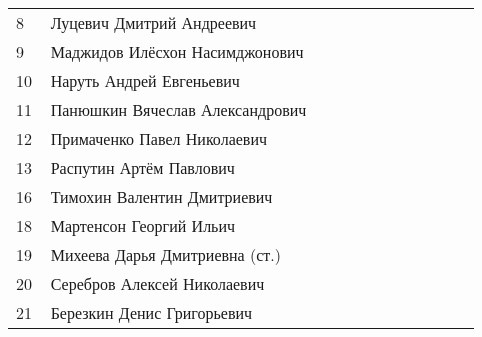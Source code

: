 \documentclass[a4paper,landscape,11pt]{article}
\newcommand*\ok{&{\small \ding{51}}} %
\newcommand*\no{&{\small }} %
\begin{document}
\begin{tabular}{p{7pt}|l|p{6pt}p{6pt}p{6pt}p{6pt}p{6pt}p{6pt}p{6pt}p{6pt}p{6pt}p{6pt}}
 8\,&Луцевич Дмитрий Андреевич          \ok\ok\ok\ok\ok\ok\ok\no\ok\ok\\
 9\,&Маджидов Илёсхон Насимджонович     \no\no\no\no\no\no\no\no\no\no\\
10\,&Наруть Андрей Евгеньевич           \no\no\no\no\no\no\no\no\no\no\\
11\,&Панюшкин Вячеслав Александрович    \ok\ok\ok\no\ok\ok\no\no\ok\ok\\
\midrule
12\,&Примаченко Павел Николаевич        \ok\ok\ok\ok\ok\ok\ok\ok\ok\ok\\
13\,&Распутин Артём Павлович            \ok\ok\no\no\no\no\ok\ok\no\no\\
16\,&Тимохин Валентин Дмитриевич        \ok\ok\ok\ok\ok\ok\ok\ok\ok\ok\\
18\,&Мартенсон Георгий Ильич            \ok\ok\ok\ok\ok\ok\ok\ok\ok\ok\\
19\,&Михеева Дарья Дмитриевна (ст.)     \ok\ok\ok\ok\ok\ok\ok\ok\ok\ok\\
20\,&Серебров Алексей Николаевич        \ok\ok\ok\ok\ok\ok\no\ok\ok\ok\\
21\,&Березкин Денис Григорьевич         \no\no\no\no\ok\ok\no\no\no\no\\
\bottomrule
\end{tabular} 
\newpage
%
\hspace{-5cm}
\end{document}
